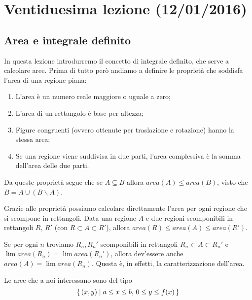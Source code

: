 \chapter{Ventiduesima lezione (12/01/2016)}

\section{Area e integrale definito}

In questa lezione introdurremo il concetto di integrale definito, che serve a calcolare aree. Prima di tutto però andiamo a definire le proprietà che soddisfa l'area di una regione piana:
\begin{enumerate}
\item L'area è un numero reale maggiore o uguale a zero;
\item L'area di un rettangolo è base per altezza;
\item Figure congruenti (ovvero ottenute per traslazione e rotazione) hanno la stessa area;
\item Se una regione viene suddivisa in due parti, l'area complessiva è la somma dell'area delle due parti.
\end{enumerate}

Da queste proprietà segue che se $A \subseteq B$ allora $area(A) \le area(B)$, visto che $B = A \cup (B \backslash A)$.

Grazie alle proprietà possiamo calcolare direttamente l'area per ogni regione che si scompone in rettangoli. Data una regione $A$ e due regioni scomponibili in rettangoli $R$, $R'$ (con $R \subset A \subset R'$), allora $area(R) \le area(A) \le area(R')$.

Se per ogni $n$ troviamo $R_n, {R_n}'$ scomponibili in rettangoli $R_n \subset A \subset {R_n}'$ e $\lim area(R_n) = \lim area({R_n}')$, allora dev'essere anche $area(A) = \lim area(R_n)$. Questa è, in effetti, la caratterizzazione dell'area.

Le aree che a noi interessano sono del tipo
\begin{equation*}
\set{(x,y)| a \le x \le b, \, 0 \le y \le f(x)}
\end{equation*}

\begin{center}
\end{center}

